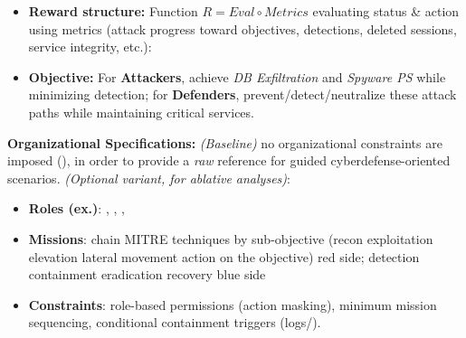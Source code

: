 {\begin{itemize}
  \item \textbf{Reward structure:} Function $R = Eval \circ Metrics$ evaluating status & action using metrics (attack progress toward objectives, detections, deleted sessions, service integrity, etc.):
  \item \textbf{Objective:} For \textbf{Attackers}, achieve \emph{DB Exfiltration} and \emph{Spyware PS} while minimizing detection; for \textbf{Defenders}, prevent/detect/neutralize these attack paths while maintaining critical services.
\end{itemize}

\medskip
\textbf{Organizational Specifications:} \emph{(Baseline)} no organizational constraints are imposed (), in order to provide a \emph{raw} reference for guided cyberdefense-oriented scenarios. \emph{(Optional variant, for ablative analyses)}:
\begin{itemize}
  \item \textbf{Roles (ex.)}: , , , 
  \item \textbf{Missions}: chain MITRE techniques by sub-objective (recon \textrightarrow{} exploitation \textrightarrow{} elevation \textrightarrow{} lateral movement \textrightarrow{} action on the objective) red side; detection \textrightarrow{} containment \textrightarrow{} eradication \textrightarrow{} recovery blue side
  \item \textbf{Constraints}: role-based permissions (action masking), minimum mission sequencing, conditional containment triggers (logs/).
\end{itemize}

}
